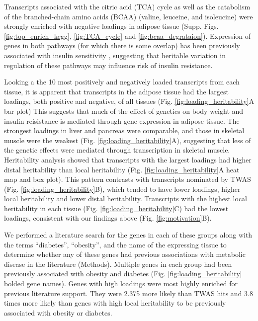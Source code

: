 \documentclass[
]{article}
\begin{document}
Transcripts associated with the citric acid (TCA) cycle as well as the
catabolism of the branched-chain amino acids (BCAA) (valine, leuceine,
and isoleucine) were strongly enriched with negative loadings in adipose
tissue (Supp. Figs. \ref{fig:top_enrich_kegg}, \ref{fig:TCA_cycle} and
\ref{fig:bcaa_degrataion}). Expression of genes in both pathways (for
which there is some overlap) has been previously associated with insulin
sensitivity \cite{pmid29567659, 
pmid22560213, pmid19841271}, suggesting that heritable variation in
regulation of these pathways may influence risk of insulin resistance.

Looking a the 10 most positively and negatively loaded transcripts from
each tissue, it is apparent that transcripts in the adipose tissue had
the largest loadings, both positive and negative, of all tissues (Fig.
\ref{fig:loading_heritability}A bar plot) This suggests that much of the
effect of genetics on body weight and insulin reisistance is mediated
through gene expression in adipose tissue. The strongest loadings in
liver and pancreas were comparable, and those in skeletal muscle were
the weakest (Fig. \ref{fig:loading_heritability}A), suggesting that less
of the genetic effects were mediated through transcription in skeletal
muscle. Heritability analysis showed that transcripts with the largest
loadings had higher distal heritability than local heritability (Fig.
\ref{fig:loading_heritability}A heat map and box plot). This pattern
contrasts with transcripts nominated by TWAS (Fig.
\ref{fig:loading_heritability}B), which tended to have lower loadings,
higher local heritability and lower distal heritability. Transcripts
with the highest local heritability in each tissue (Fig.
\ref{fig:loading_heritability}C) had the lowest loadings, consistent
with our findings above (Fig. \ref{fig:motivation}B).

We performed a literature search for the genes in each of these groups
along with the terms ``diabetes'', ``obesity'', and the name of the
expressing tissue to determine whether any of these genes had previous
associations with metabolic disease in the literature (Methods).
Multiple genes in each group had been previously associated with obesity
and diabetes (Fig. \ref{fig:loading_heritability} bolded gene names).
Genes with high loadings were most highly enriched for previous
literature support. They were 2.375 more likely than TWAS hits and 3.8
times more likely than genes with high local heritability to be
previously associated with obesity or diabetes.
\end{document}
